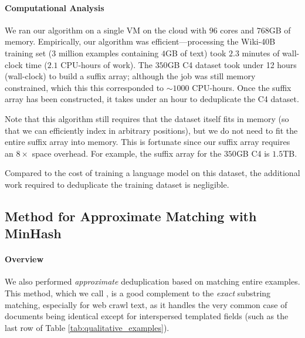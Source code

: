 \paragraph{Computational Analysis}
We ran our algorithm on a single VM on the cloud with $96$ cores and $768$GB of memory.
Empirically, our algorithm was efficient---processing the Wiki-40B training set ($3$ million
examples containing $4$GB of text) took $2.3$ minutes of wall-clock time ($2.1$ CPU-hours of work).
%
The $350$GB C4 dataset took under 12 hours (wall-clock) to build a suffix array; although the job was still memory constrained, which this this corresponded to $\sim 1000$ CPU-hours. 
% 
Once the suffix array has been constructed, it takes under an hour to deduplicate the C4 dataset.


Note that this algorithm still requires that the dataset itself fits in memory
(so that we can efficiently index in arbitrary positions), but we do not need to fit the entire suffix array into memory.
This is fortunate since our suffix array requires an $8\times$ space overhead.
For example, the suffix array for the
$350$GB C4 is $1.5$TB.

%

Compared to the cost of training a language model on this dataset, the additional
work required to deduplicate the training dataset is negligible.








\subsection{Method for Approximate Matching with MinHash} \label{sec:approx}

\paragraph{Overview}

We also performed \emph{approximate} deduplication based on matching entire examples.
This method, which we call \Approx, is a good complement to the \emph{exact} substring matching, especially for web crawl text, as it handles the very common case of documents being identical except for interspersed templated fields (such as the last row of Table \ref{tab:qualitative_examples}).

